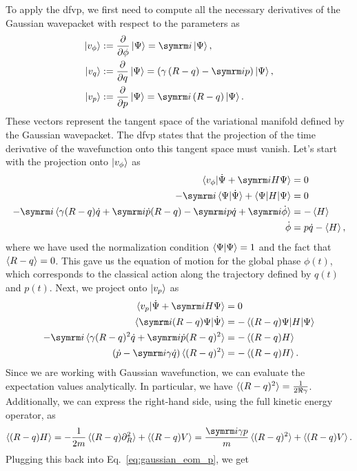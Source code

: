 To apply the \gls{dfvp}, we first need to compute all the necessary derivatives of the Gaussian wavepacket with respect to the parameters as
\begin{align}
\ket{v_\phi}&:=\frac{\partial}{\partial \phi}\ket{\Psi}=\i\ket{\Psi},\\
\ket{v_q}&:=\frac{\partial}{\partial q}\ket{\Psi}=\left(\gamma\left(R-q\right)-\i p\right)\ket{\Psi},\\
\ket{v_p}&:=\frac{\partial}{\partial p}\ket{\Psi}=\i\left(R-q\right)\ket{\Psi}.
\end{align}
These vectors represent the tangent space of the variational manifold defined by the Gaussian wavepacket. The \gls{dfvp} states that the projection of the time derivative of the wavefunction onto this tangent space must vanish. Let's start with the projection onto $\ket{v_\phi}$ as
\begin{align}
\braket{v_\phi|\dot\Psi+\i H\Psi}&=0\\
-\i\braket{\Psi|\dot\Psi}+\braket{\Psi|H|\Psi}&=0\\
-\i\braket{\gamma(R-q)\dot q+\i\dot p(R-q)-\i p\dot q+\i\dot\phi}&=-\braket{H}\\
\dot\phi&=p\dot q-\braket{H},\label{eq:gaussian_eom_phi}
\end{align}
where we have used the normalization condition $\braket{\Psi|\Psi}=1$ and the fact that $\braket{R-q}=0$. This gave us the equation of motion for the global phase $\phi(t)$, which corresponds to the classical action along the trajectory defined by $q(t)$ and $p(t)$. Next, we project onto $\ket{v_p}$ as
\begin{align}
\braket{v_p|\dot\Psi+\i H\Psi}&=0\\
\braket{\i(R-q)\Psi|\dot\Psi}&=-\braket{(R-q)\Psi|H|\Psi}\\
-\i\braket{\gamma(R-q)^2\dot q+\i\dot p(R-q)^2}&=-\braket{(R-q)H}\\
(\dot p-\i\gamma\dot q)\braket{(R-q)^2}&=-\braket{(R-q)H}.\label{eq:gaussian_eom_p}
\end{align}
Since we are working with Gaussian wavefunction, we can evaluate the expectation values analytically. In particular, we have $\braket{(R-q)^2}=\frac{1}{2\Re\gamma}$. Additionally, we can express the right-hand side, using the full kinetic energy operator, as
\begin{equation}
\braket{(R-q)H}=-\frac{1}{2m}\braket{(R-q)\partial_R^2}+\Braket{(R-q)V}=\frac{\i\gamma p}{m}\braket{(R-q)^2}+\braket{(R-q)V}.
\end{equation}
Plugging this back into Eq.~\eqref{eq:gaussian_eom_p}, we get
